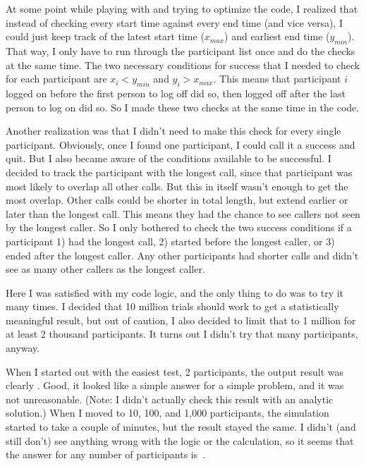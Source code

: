 \documentclass{article}
\begin{document}
At some point while playing with and trying to optimize the code, I realized that instead of checking every start time against every end time (and vice versa), I could just keep track of the latest start time ($x_{max}$) and earliest end time ($y_{min}$).
That way, I only have to run through the participant list once and do the checks at the same time.
The two necessary conditions for success that I needed to check for each participant are $x_{i}<y_{min}$ and $y_{i}>x_{max}$.
This means that participant $i$ logged on before the first person to log off did so, then logged off after the last person to log on did so.
So I made these two checks at the same time in the code.

Another realization was that I didn't need to make this check for every single participant.
Obviously, once I found one participant, I could call it a success and quit.
But I also became aware of the conditions available to be successful.
I decided to track the participant with the longest call, since that participant was most likely to overlap all other calls.
But this in itself wasn't enough to get the most overlap.
Other calls could be shorter in total length, but extend earlier or later than the longest call.
This means they had the chance to see callers not seen by the longest caller.
So I only bothered to check the two success conditions if a participant 1) had the longest call, 2) started before the longest caller, or 3) ended after the longest caller.
Any other participants had shorter calls and didn't see as many other callers as the longest caller.

Here I was satisfied with my code logic, and the only thing to do was to try it many times.
I decided that 10 million trials should work to get a statistically meaningful result, but out of caution, I also decided to limit that to 1 million for at least 2 thousand participants.
It turns out I didn't try that many participants, anyway.

When I started out with the easiest test, 2 participants, the output result was clearly .
Good, it looked like a simple answer for a simple problem, and it was not unreasonable.
(Note: I didn't actually check this result with an analytic solution.)
When I moved to 10, 100, and 1,000 participants, the simulation started to take a couple of minutes, but the result stayed the same.
I didn't (and still don't) see anything wrong with the logic or the calculation, so it seems that the answer for any number of participants is
\,.
\end{document}
